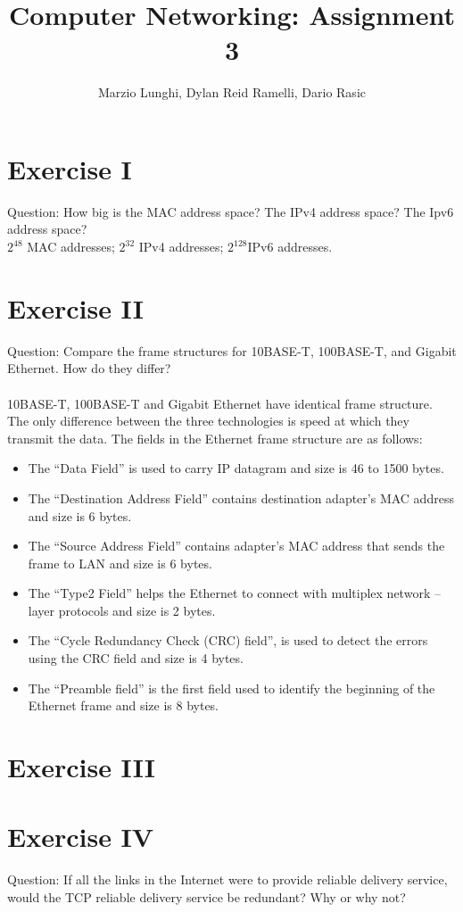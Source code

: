 \documentclass[11pt]{article}
\title{Computer Networking: Assignment 3}
\author{Marzio Lunghi, Dylan Reid Ramelli, Dario Rasic}
\begin{document}
	\maketitle
	\newpage
	\section*{Exercise I}
	Question: How big is the MAC address space? The IPv4 address space? The Ipv6 address space?\\
	$2^{48}$ MAC addresses; $2^{32}$ IPv4 addresses; $2^{128}$IPv6 addresses.
	
	\section*{Exercise II}
	Question: Compare the frame structures for 10BASE-T, 100BASE-T,
	and Gigabit Ethernet. How do they differ?\\ \\
	10BASE-T, 100BASE-T and Gigabit Ethernet have identical frame structure.
	The only difference between the three technologies is speed at which they transmit the data.
	The fields in the Ethernet frame structure are as follows:
	\begin{itemize}
		\item The “Data Field” is used to carry IP datagram and size is 46 to 1500 bytes.
		\item 	The “Destination Address Field” contains destination adapter’s MAC address and size is 6 bytes.
		\item 	The “Source Address Field” contains adapter’s MAC address that sends the frame to LAN and size is 6 bytes. 
		\item 	The “Type2 Field” helps the Ethernet to connect with multiplex network – layer protocols and size is 2 bytes.
		\item The “Cycle Redundancy Check (CRC) field”, is used to detect the errors using the CRC field and size is 4 bytes.
		\item 	The “Preamble field” is the first field used to identify the beginning of the Ethernet frame and size is 8 bytes.
	\end{itemize}

	\section*{Exercise III}
	\section*{Exercise IV}
	Question: If all the links in the Internet were to provide reliable delivery service, would the TCP reliable delivery service be redundant? Why or why not?\\ 
	
\end{document}
